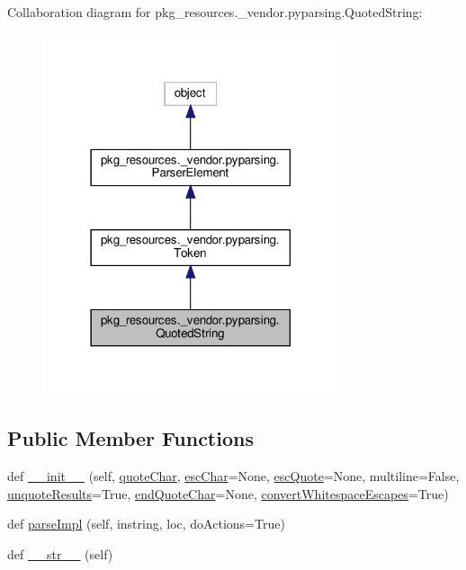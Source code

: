 Collaboration diagram for pkg\+\_\+resources.\+\_\+vendor.\+pyparsing.\+Quoted\+String\+:
\nopagebreak
\begin{figure}[H]
\begin{center}
\leavevmode
\includegraphics[width=246pt]{classpkg__resources_1_1__vendor_1_1pyparsing_1_1QuotedString__coll__graph}
\end{center}
\end{figure}
\subsection*{Public Member Functions}
\begin{DoxyCompactItemize}
\item 
def \hyperlink{classpkg__resources_1_1__vendor_1_1pyparsing_1_1QuotedString_a054ca15d9853c22d1028d13a7208b4be}{\+\_\+\+\_\+init\+\_\+\+\_\+} (self, \hyperlink{classpkg__resources_1_1__vendor_1_1pyparsing_1_1QuotedString_a9fd21377820ca6289c84123a1b22b08e}{quote\+Char}, \hyperlink{classpkg__resources_1_1__vendor_1_1pyparsing_1_1QuotedString_acb6bd36e2339b38d9808246c4d58de5b}{esc\+Char}=None, \hyperlink{classpkg__resources_1_1__vendor_1_1pyparsing_1_1QuotedString_a8933bcacb2af5f1ea0975f699ee742b2}{esc\+Quote}=None, multiline=False, \hyperlink{classpkg__resources_1_1__vendor_1_1pyparsing_1_1QuotedString_ad74814bda4fde89c31beb5bdffae0907}{unquote\+Results}=True, \hyperlink{classpkg__resources_1_1__vendor_1_1pyparsing_1_1QuotedString_ae3b9ebc7f9a97d031ada29b6f3264771}{end\+Quote\+Char}=None, \hyperlink{classpkg__resources_1_1__vendor_1_1pyparsing_1_1QuotedString_a4b906c2e698a2cd5854b8d0829467f1b}{convert\+Whitespace\+Escapes}=True)
\item 
def \hyperlink{classpkg__resources_1_1__vendor_1_1pyparsing_1_1QuotedString_ae03a1fe1d89a69ff5972dc9ab2151968}{parse\+Impl} (self, instring, loc, do\+Actions=True)
\item 
def \hyperlink{classpkg__resources_1_1__vendor_1_1pyparsing_1_1QuotedString_a7038e3b8ae9396644d53db914902dbda}{\+\_\+\+\_\+str\+\_\+\+\_\+} (self)
\end{DoxyCompactItemize}
